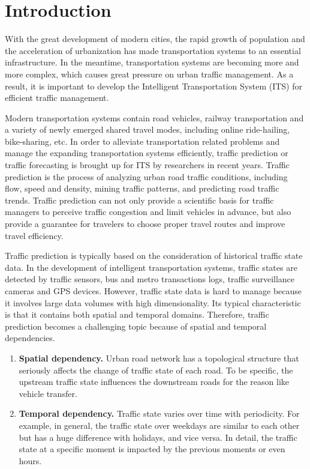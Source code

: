 
\section{Introduction}
With the great development of modern cities, the rapid growth of population and the acceleration of urbanization has made transportation systems to an essential infrastructure. In the meantime, transportation systems are becoming more and more complex, which causes great pressure on urban traffic management. As a result, it is important to develop the Intelligent Transportation System (ITS)\cite{ITS} for efficient traffic management.

Modern transportation systems contain road vehicles, railway transportation and a variety of newly emerged shared travel modes, including online ride-hailing, bike-sharing, etc. In order to alleviate transportation related problems and manage the expanding transportation systems efficiently, traffic prediction or traffic forecasting is brought up for ITS by researchers in recent years. Traffic prediction is the process of analyzing urban road traffic conditions, including flow, speed and density, mining traffic patterns, and predicting road traffic trends. Traffic prediction can not only provide a scientific basis for traffic managers to perceive traffic congestion and limit vehicles in advance, but also provide a guarantee for travelers to choose proper travel routes and improve travel efficiency.

Traffic prediction is typically based on the consideration of historical traffic state data. In the development of intelligent transportation systems, traffic states are detected by traffic sensors, bus and metro transactions logs, traffic surveillance cameras and GPS devices. However, traffic state data is hard to manage because it involves large data volumes with high dimensionality. Its typical characteristic is that it contains both spatial and temporal domains.
Therefore, traffic prediction becomes a challenging topic because of spatial and temporal dependencies.
\begin{enumerate}
    \item \textbf{Spatial dependency.} Urban road network has a topological structure that seriously affects the change of traffic state of each road. To be specific, the upstream traffic state influences the downstream roads for the reason like vehicle transfer.
    
    \item \textbf{Temporal dependency.} Traffic state varies over time with periodicity. For example, in general, the traffic state over weekdays are similar to each other but has a huge difference with holidays, and vice versa. In detail, the traffic state at a specific moment is impacted by the previous moments or even hours.
\end{enumerate}

